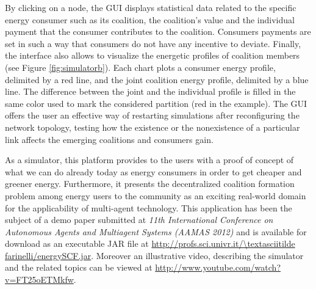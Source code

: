 \documentclass[11pt, twoside, titlepage, a4paper, openright]{report}
\begin{document}
\noindent By clicking on a node, the GUI displays statistical data related to the
specific energy consumer such as its coalition, the coalition's value
and the individual payment that the consumer contributes to the coalition.
Consumers payments are set in such a way that consumers do not have any
incentive to deviate. 
Finally, the interface also allows to visualize the energetic profiles of coalition members (see Figure \ref{fig:simulatorb}).
Each chart plots a consumer energy profile, delimited by a red line, and the joint coalition energy profile,
delimited by a blue line. The difference between the joint and the individual profile is
filled in the same color used to mark the considered partition (red in the example). 
The GUI offers the user an effective way of restarting simulations after reconfiguring the network
topology, testing how the existence or the nonexistence of a particular link affects the emerging
coalitions and consumers gain.


As a simulator, this platform provides to the users with a proof of concept of
what we can do already today as energy consumers in order to get cheaper and
greener energy. Furthermore, it presents the decentralized coalition formation
problem among energy users to the community as an exciting real-world domain for
the applicability of multi-agent technology.
This application has been the subject of a demo paper submitted at \textit{11th International Conference on Autonomous Agents and Multiagent Systems (AAMAS 2012)} \cite{bistaffa} and is available for download as an executable JAR file at \url{http://profs.sci.univr.it/\textasciitilde farinelli/energySCF.jar}. Moreover an illustrative video, describing the simulator and the related topics can be viewed at \url{http://www.youtube.com/watch?v=FT25oETMkfw}.
\end{document}
